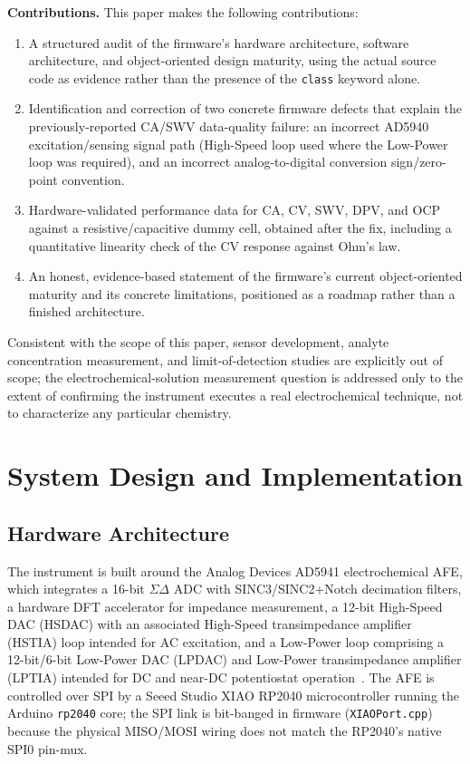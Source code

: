 \documentclass[preprint,12pt]{elsarticle}
\begin{document}
\textbf{Contributions.} This paper makes the following contributions:
\begin{enumerate}
\item A structured audit of the firmware's hardware architecture, software architecture, and object-oriented design maturity, using the actual source code as evidence rather than the presence of the \texttt{class} keyword alone.
\item Identification and correction of two concrete firmware defects that explain the previously-reported CA/SWV data-quality failure: an incorrect AD5940 excitation/sensing signal path (High-Speed loop used where the Low-Power loop was required), and an incorrect analog-to-digital conversion sign/zero-point convention.
\item Hardware-validated performance data for CA, CV, SWV, DPV, and OCP against a resistive/capacitive dummy cell, obtained after the fix, including a quantitative linearity check of the CV response against Ohm's law.
\item An honest, evidence-based statement of the firmware's current object-oriented maturity and its concrete limitations, positioned as a roadmap rather than a finished architecture.
\end{enumerate}

Consistent with the scope of this paper, sensor development, analyte concentration measurement, and limit-of-detection studies are explicitly out of scope; the electrochemical-solution measurement question is addressed only to the extent of confirming the instrument executes a real electrochemical technique, not to characterize any particular chemistry.

\section{System Design and Implementation}

\subsection{Hardware Architecture}
The instrument is built around the Analog Devices AD5941 electrochemical AFE, which integrates a 16-bit $\Sigma\Delta$ ADC with SINC3/SINC2+Notch decimation filters, a hardware DFT accelerator for impedance measurement, a 12-bit High-Speed DAC (HSDAC) with an associated High-Speed transimpedance amplifier (HSTIA) loop intended for AC excitation, and a Low-Power loop comprising a 12-bit/6-bit Low-Power DAC (LPDAC) and Low-Power transimpedance amplifier (LPTIA) intended for DC and near-DC potentiostat operation~\cite{ref:ad5940datasheet}. The AFE is controlled over SPI by a Seeed Studio XIAO RP2040 microcontroller running the Arduino \texttt{rp2040} core; the SPI link is bit-banged in firmware (\texttt{XIAOPort.cpp}) because the physical MISO/MOSI wiring does not match the RP2040's native SPI0 pin-mux.
\end{document}
